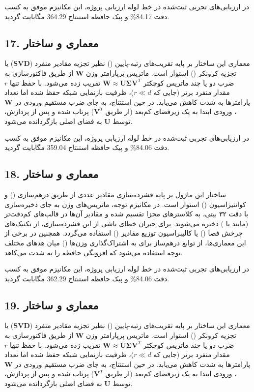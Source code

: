 \documentclass[12pt,a4paper]{report}
\theoremstyle{definition}
\begin{document}
در ارزیابی‌های تجربی ثبت‌شده در خط لوله ارزیابی پروژه، این مکانیزم موفق به کسب دقت 84.17\% و پیک حافظه استنتاج 364.29 مگابایت گردید.

\subsection*{17. معماری و ساختار }
معماری این ساختار بر پایه تقریب‌های رتبه-پایین () نظیر تجزیه مقادیر منفرد ($\mathbf{SVD}$) یا تجزیه کرونکر () استوار است. ماتریس پرپارامتر وزن $\mathbf{W}$ از طریق فاکتورسازی به ضرب دو یا چند ماتریس کوچکتر $\mathbf{W} \approx \mathbf{U} \mathbf{\Sigma} \mathbf{V}^T$ تقریب زده می‌شود. با حفظ تنها $r$ مقدار منفرد برتر (جایی که $r \ll d$)، ظرفیت بازنمایی شبکه حفظ شده اما تعداد پارامترها به شدت کاهش می‌یابد. در حین استنتاج، به جای ضرب مستقیم ورودی در $\mathbf{W}$، ورودی ابتدا به یک زیرفضای کم‌بعد (از طریق $\mathbf{V}^T$) پرتاب شده و پس از پردازش، توسط $\mathbf{U}$ به فضای اصلی بازگردانده می‌شود.

در ارزیابی‌های تجربی ثبت‌شده در خط لوله ارزیابی پروژه، این مکانیزم موفق به کسب دقت 84.06\% و پیک حافظه استنتاج 359.04 مگابایت گردید.

\subsection*{18. معماری و ساختار }
ساختار این ماژول بر پایه فشرده‌سازی مقادیر عددی از طریق درهم‌سازی () و کوانتیزاسیون () استوار است. در مکانیزم توجه، ماتریس‌های وزن به جای ذخیره‌سازی با دقت ۳۲ بیتی، به کلاسترهای مجزا تقسیم شده و مقادیر آن‌ها در قالب‌های کم‌دقت‌تر (مانند  یا ) ذخیره می‌شوند. برای جبران خطای ناشی از این فشرده‌سازی، از تکنیک‌های چرخش فضا () یا کالیبراسیون توزیع مقادیر () استفاده می‌گردد. همچنین در برخی از این معماری‌ها، از توابع درهم‌ساز برای به اشتراک‌گذاری وزن‌ها () میان هد‌های مختلف توجه استفاده می‌شود که افزونگی حافظه را به شدت می‌کاهد.

در ارزیابی‌های تجربی ثبت‌شده در خط لوله ارزیابی پروژه، این مکانیزم موفق به کسب دقت 84.06\% و پیک حافظه استنتاج 362.29 مگابایت گردید.

\subsection*{19. معماری و ساختار }
معماری این ساختار بر پایه تقریب‌های رتبه-پایین () نظیر تجزیه مقادیر منفرد ($\mathbf{SVD}$) یا تجزیه کرونکر () استوار است. ماتریس پرپارامتر وزن $\mathbf{W}$ از طریق فاکتورسازی به ضرب دو یا چند ماتریس کوچکتر $\mathbf{W} \approx \mathbf{U} \mathbf{\Sigma} \mathbf{V}^T$ تقریب زده می‌شود. با حفظ تنها $r$ مقدار منفرد برتر (جایی که $r \ll d$)، ظرفیت بازنمایی شبکه حفظ شده اما تعداد پارامترها به شدت کاهش می‌یابد. در حین استنتاج، به جای ضرب مستقیم ورودی در $\mathbf{W}$، ورودی ابتدا به یک زیرفضای کم‌بعد (از طریق $\mathbf{V}^T$) پرتاب شده و پس از پردازش، توسط $\mathbf{U}$ به فضای اصلی بازگردانده می‌شود.
\end{document}

